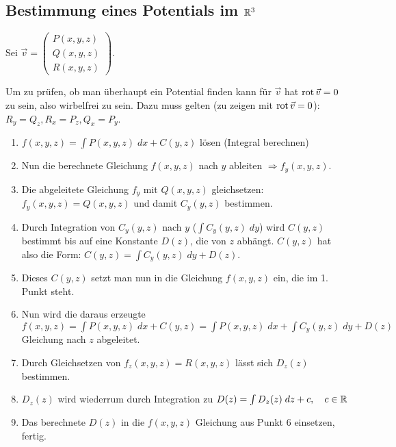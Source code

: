 \subsection{Bestimmung eines Potentials im $\mathbb{R}^3$}
Sei $\vec{v} = \begin{pmatrix}
P(x,y,z)\\
Q(x,y,z)\\
R(x,y,z)
\end{pmatrix}$.

Um zu prüfen, ob man überhaupt ein Potential finden kann für $\vec{v}$ hat $\operatorname{rot} \vec{v} = 0$
zu sein, also wirbelfrei zu sein. Dazu muss gelten (zu zeigen mit $\operatorname{rot} \vec{v} = 0$): $R_y = Q_z, R_x = P_z, Q_x = P_y$.

\begin{enumerate}[itemsep=1em]
	\item $f(x,y,z) = \int P(x,y,z)\;dx + C(y,z)$ lösen (Integral berechnen)
	\item Nun die berechnete Gleichung $f(x,y,z)$ nach $y$ ableiten $\Rightarrow f_y(x,y,z)$.
	\item Die abgeleitete Gleichung $f_y$ mit $Q(x,y,z)$ gleichsetzen: $f_y(x,y,z) = Q(x,y,z)$
	und damit $C_y(y,z)$ bestimmen.
	\item Durch Integration von $C_y(y,z)$ nach $y$ ($\int C_y(y,z)\;dy$) wird $C(y,z)$ bestimmt
	bis auf eine Konstante $D(z)$, die von $z$ abhängt. $C(y,z)$ hat also die Form:
	$C(y,z) = \int C_y(y,z)\; dy + D(z)$.
	\item Dieses $C(y,z)$ setzt man nun in die Gleichung $f(x,y,z)$ ein, die im 1. Punkt steht.
	\item Nun wird die daraus erzeugte
	$f(x,y,z) = \int P(x,y,z)\;dx + C(y,z) = \int P(x,y,z)\;dx + \int C_y(y,z)\; dy + D(z)$
	Gleichung nach $z$ abgeleitet.
	\item Durch Gleichsetzen von $f_z(x,y,z) = R(x,y,z)$ lässt sich $D_z(z)$ bestimmen.
	\item $D_z(z)$ wird wiederrum durch Integration zu $D(z) = \int D_z(z)\; dz + c, \quad c \in \mathbb{R}$
	\item Das berechnete $D(z)$ in die $f(x,y,z)$ Gleichung aus Punkt 6 einsetzen, fertig.
\end{enumerate}


